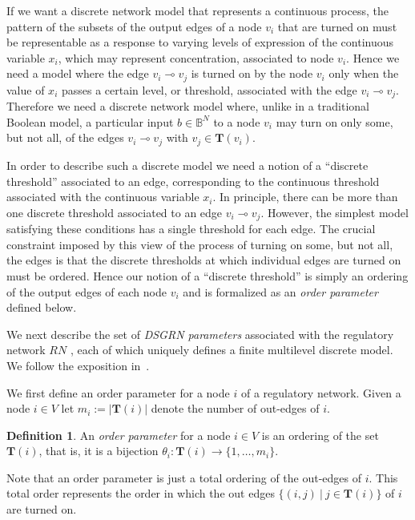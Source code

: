 \documentclass[12pt, notitlepage]{amsart}
\theoremstyle{definition}
\newtheorem{defn}[thm]{Definition}
\newcommand{\Targets}{\mathbf{T}}
\newcommand{\bbB}{\mathbb{B}}
\begin{document}
  If we want a discrete network model that represents a continuous process, the pattern of the subsets of the output edges of a node $v_i$ that are turned on must be representable as a response to varying levels of expression of the continuous variable $x_i$, which may represent concentration, associated to node $v_i$. Hence we need a model where the edge $v_i \multimap v_j$ is turned on by the node $v_i$ only when the value of $x_i$ passes a certain level, or threshold, associated with the edge $v_i \multimap v_j$. Therefore we need a discrete network model where, unlike in a traditional Boolean model, a particular input $b \in \bbB^N$ to a node $v_i$ may turn on only some, but not all, of the edges $v_i \multimap v_j$ with $v_j \in \Targets(v_i)$.

  In order to describe such a discrete model we need a notion of a ``discrete threshold'' associated to an edge, corresponding to the continuous threshold associated with the continuous variable $x_i$. In principle, there can be more than one discrete threshold associated to an edge $v_i \multimap v_j$. However, the simplest model satisfying these conditions has a single threshold for each edge. The crucial constraint imposed by this view of the process of turning on some, but not all, the edges is that the discrete thresholds at which individual edges are turned on must be ordered. Hence our notion of a ``discrete threshold'' is simply an ordering of the output edges of each node $v_i$ and is formalized as an \emph{order parameter} defined below.

  We next describe the set of \emph{DSGRN parameters} associated with the regulatory network $RN$ \cite{E2,duncan3}, each of which uniquely defines a finite multilevel discrete model. We follow the exposition in~\cite{E2}.

  We first define an order parameter for a node $i$ of a regulatory network. Given a node $i \in V$ let $m_i:= | \Targets(i) |$ denote the number of out-edges of $i$.

  \begin{defn}
    \label{defn:order_parameter}
    An \emph{order parameter} for a node $i \in V$ is an ordering  of the set $\Targets(i)$, that is, it is a bijection $\theta_i \colon \Targets(i) \to \{1, \ldots, m_i \}$.
  \end{defn}

  Note that an order parameter is just a total ordering of the out-edges of $i$. This total order represents the order in which the out edges $\{ (i, j) \ | \ j \in \Targets(i) \}$ of $i$ are turned on.
\end{document}
